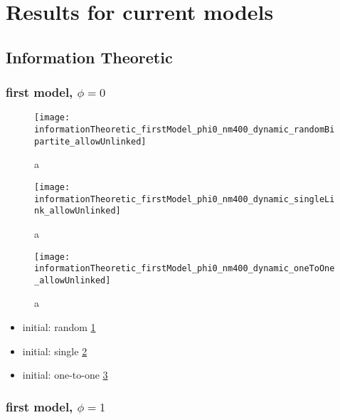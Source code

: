 \section{Results for current models}
\label{sec:results_new}

\subsection{Information Theoretic}

\subsubsection{first model, $\phi=0$}

\begin{figure}
  \centering
  \texttt{[image: informationTheoretic\_firstModel\_phi0\_nm400\_dynamic\_randomBipartite\_allowUnlinked]}
  \caption{a}
  \label{fig:informationTheoretic_firstModel_phi0_nm400_dynamic_randomBipartite_allowUnlinked}
\end{figure}

\begin{figure}
  \centering
  \texttt{[image: informationTheoretic\_firstModel\_phi0\_nm400\_dynamic\_singleLink\_allowUnlinked]}
  \caption{a}
  \label{fig:informationTheoretic_firstModel_phi0_nm400_dynamic_singleLink_allowUnlinked}
\end{figure}

\begin{figure}
  \centering
  \texttt{[image: informationTheoretic\_firstModel\_phi0\_nm400\_dynamic\_oneToOne\_allowUnlinked]}
  \caption{a}
  \label{fig:informationTheoretic_firstModel_phi0_nm400_dynamic_oneToOne_allowUnlinked}
\end{figure}

\begin{itemize}
\item initial: random \ref{fig:informationTheoretic_firstModel_phi0_nm400_dynamic_randomBipartite_allowUnlinked}
\item initial: single \ref{fig:informationTheoretic_firstModel_phi0_nm400_dynamic_singleLink_allowUnlinked}
\item initial: one-to-one \ref{fig:informationTheoretic_firstModel_phi0_nm400_dynamic_oneToOne_allowUnlinked}
\end{itemize}

\subsubsection{first model, $\phi=1$}

